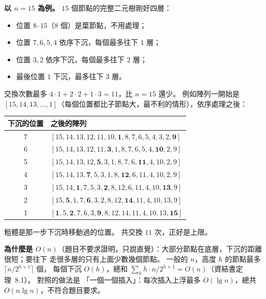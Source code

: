 \begin{pastsoln}
\textbf{以 $n = 15$ 為例。} $15$ 個節點的完整二元樹剛好四層：
\begin{itemize}
\item 位置 $8$--$15$（$8$ 個）是葉節點，不用處理；
\item 位置 $7, 6, 5, 4$ 依序下沉，每個最多往下 $1$ 層；
\item 位置 $3, 2$ 依序下沉，每個最多往下 $2$ 層；
\item 最後位置 $1$ 下沉，最多往下 $3$ 層。
\end{itemize}
交換次數最多 $4 \cdot 1 + 2 \cdot 2 + 1 \cdot 3 = 11$，比 $n = 15$ 還少。 例如陣列一開始是
$[15, 14, 13, \ldots, 1]$（每個位置都比子節點大，最不利的情形），依序處理之後：
\begin{center}
\small
\begin{tabular}{cl}
\toprule
下沉的位置 & 之後的陣列 \\
\midrule
7 & $[15, 14, 13, 12, 11, 10, \mathbf{1}, 8, 7, 6, 5, 4, 3, 2, \mathbf{9}]$ \\
6 & $[15, 14, 13, 12, 11, \mathbf{3}, 1, 8, 7, 6, 5, 4, \mathbf{10}, 2, 9]$ \\
5 & $[15, 14, 13, 12, \mathbf{5}, 3, 1, 8, 7, 6, \mathbf{11}, 4, 10, 2, 9]$ \\
4 & $[15, 14, 13, \mathbf{7}, 5, 3, 1, 8, \mathbf{12}, 6, 11, 4, 10, 2, 9]$ \\
3 & $[15, 14, \mathbf{1}, 7, 5, 3, \mathbf{2}, 8, 12, 6, 11, 4, 10, \mathbf{13}, 9]$ \\
2 & $[15, \mathbf{5}, 1, 7, \mathbf{6}, 3, 2, 8, 12, \mathbf{14}, 11, 4, 10, 13, 9]$ \\
1 & $[\mathbf{1}, 5, \mathbf{2}, 7, 6, 3, \mathbf{9}, 8, 12, 14, 11, 4, 10, 13, \mathbf{15}]$ \\
\bottomrule
\end{tabular}
\end{center}
粗體是那一步下沉時移動過的位置。 共交換 $11$ 次，正好是上限。

\textbf{為什麼是 $O(n)$}（題目不要求證明，只說直覺）：大部分節點在底層，下沉的距離很短；要往下
走很多層的只有上面少數幾個節點。 一般的 $n$，高度 $h$ 的節點最多 $\lceil n/2^{h+1} \rceil$ 個，
每個下沉 $O(h)$，總和 $\sum_h h \cdot n/2^{h+1} = O(n)$（資結書定理~8.1）。 對照的做法是
「一個一個插入」：每次插入上浮最多 $O(\lg n)$，總共 $O(n \lg n)$，不符合題目要求。
\end{pastsoln}
